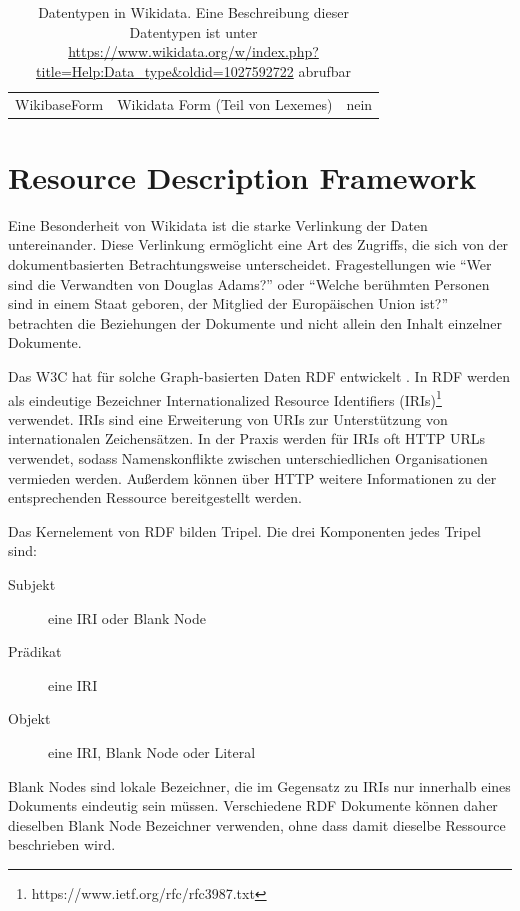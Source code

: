 \begin{table}
\begin{adjustwidth}{-1.5cm}{-0.5cm}
\begin{minipage}{\textwidth}
\begin{tabular}{l p{} p{}}
      WikibaseForm     & Wikidata Form (Teil von Lexemes)                                                                                                                              & nein
    \end{tabular}
    \end{minipage}
  \end{adjustwidth}
  \caption{Datentypen in Wikidata. Eine Beschreibung dieser Datentypen ist unter \url{https://www.wikidata.org/w/index.php?title=Help:Data_type&oldid=1027592722} abrufbar}
  \label{tab:wd-datatypes}
\end{table}

\section{Resource Description Framework}
Eine Besonderheit von Wikidata ist die starke Verlinkung der Daten untereinander.
Diese Verlinkung ermöglicht eine Art des Zugriffs, die sich von der dokumentbasierten Betrachtungsweise unterscheidet.
Fragestellungen wie "`Wer sind die Verwandten von Douglas Adams?"' oder "`Welche berühmten Personen sind in einem Staat geboren, der Mitglied der Europäischen Union ist?"' betrachten die Beziehungen der Dokumente und nicht allein den Inhalt einzelner Dokumente.

Das W3C hat für solche Graph-basierten Daten RDF entwickelt \cite{rdf-spec}.
In RDF werden als eindeutige Bezeichner Internationalized Resource Identifiers (IRIs)\footnote{https://www.ietf.org/rfc/rfc3987.txt} verwendet.
IRIs sind eine Erweiterung von URIs zur Unterstützung von internationalen Zeichensätzen.
In der Praxis werden für IRIs oft HTTP URLs verwendet, sodass Namenskonflikte zwischen unterschiedlichen Organisationen vermieden werden.
Außerdem können über HTTP weitere Informationen zu der entsprechenden Ressource bereitgestellt werden.

Das Kernelement von RDF bilden Tripel. Die drei Komponenten jedes Tripel sind:
\begin{description}
\item[Subjekt] eine IRI oder Blank Node
\item[Prädikat] eine IRI
\item[Objekt] eine IRI, Blank Node oder Literal
\end{description}
Blank Nodes sind lokale Bezeichner, die im Gegensatz zu IRIs nur innerhalb eines Dokuments eindeutig sein müssen.
Verschiedene RDF Dokumente können daher dieselben Blank Node Bezeichner verwenden, ohne dass damit dieselbe Ressource beschrieben wird.

